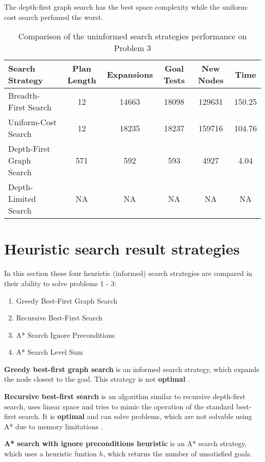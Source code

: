 \documentclass[11pt]{article}
\begin{document}
The depth-first graph search has the best space complexity while the uniform-cost search perfomed the worst.

\begin{table}[H]
  \centering
  \caption{Comparison of the uninformed search strategies performance on Problem 3}
  \bigskip
  \label{table:nhp3}
  \bgroup
  \def\arraystretch{1.5}
  \begin{tabular}{l|c|c|c|c|c}
    Search Strategy & Plan Length & Expansions & Goal Tests & New Nodes & Time \\
    \hline
    Breadth-First Search & 12 & 14663 & 18098 & 129631 & 150.25 \\
    Uniform-Cost Search & 12 & 18235 & 18237 & 159716 & 104.76 \\
    Depth-First Graph Search & 571 & 592 & 593 & 4927 & 4.04 \\
    Depth-Limited Search & NA & NA & NA & NA & NA \\
  \end{tabular}
  \egroup
\end{table}

\section{Heuristic search result strategies}

In this section these four heuristic (informed) search strategies are compared in their ability to solve problems 1 - 3:

\begin{enumerate}
  \item Greedy Best-First Graph Search
  \item Recursive Best-First Search
  \item A* Search Ignore Preconditions
  \item A* Search Level Sum
\end{enumerate}

\textbf{Greedy best-first graph search} is an informed search strategy, which expands the node closest to the goal. This strategy is not \textbf{optimal} \autocite{russell2010artificial}.

\textbf{Recursive best-first search} is an algorithm similar to recursive depth-first search, uses linear space and tries to mimic the operation of the standard best-first search. It is \textbf{optimal} and can solve problems, which are not solvable using A* due to memory limitations \autocite{russell2010artificial}.

\textbf{A* search with ignore preconditions heuristic} is an A* search strategy, which uses a heuristic funtion $h$, which returns the number of unsatisfied goals.
\end{document}
